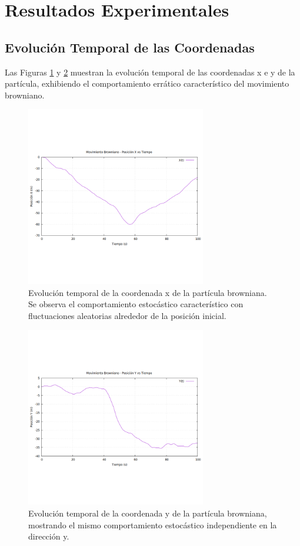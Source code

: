 \documentclass[11pt,a4paper]{article}
\begin{document}
\section{Resultados Experimentales}

\subsection{Evolución Temporal de las Coordenadas}
Las Figuras \ref{fig:x_vs_t} y \ref{fig:y_vs_t} muestran la evolución temporal de las coordenadas x e y de la partícula, exhibiendo el comportamiento errático característico del movimiento browniano.

\begin{figure}[h!]
    \centering
    \includegraphics[width=0.7\textwidth]{../results/browniano_sim_plot_x_vs_t.png}
    \caption{Evolución temporal de la coordenada x de la partícula browniana. Se observa el comportamiento estocástico característico con fluctuaciones aleatorias alrededor de la posición inicial.}
    \label{fig:x_vs_t}
\end{figure}

\begin{figure}[h!]
    \centering
    \includegraphics[width=0.7\textwidth]{../results/browniano_sim_plot_y_vs_t.png}
    \caption{Evolución temporal de la coordenada y de la partícula browniana, mostrando el mismo comportamiento estocástico independiente en la dirección y.}
    \label{fig:y_vs_t}
\end{figure}
\end{document}
